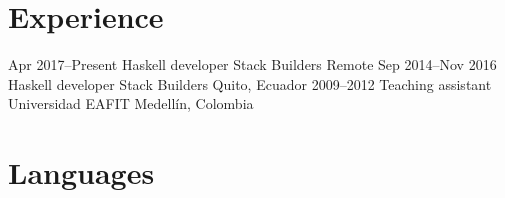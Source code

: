 \documentclass[12pt,letterpaper,sans]{moderncv}
\begin{document}
\makecvtitle

\section{Experience}

\cventry
  {Apr 2017--Present}
  {Haskell developer}
  {Stack Builders}
  {Remote}
  {}
  {}
\cventry
  {Sep 2014--Nov 2016}
  {Haskell developer}
  {Stack Builders}
  {Quito, Ecuador}
  {}
  {}
\cventry
  {2009--2012}
  {Teaching assistant}
  {Universidad EAFIT}
  {Medellín, Colombia}
  {}
  {}

\section{Languages}

\end{document}
